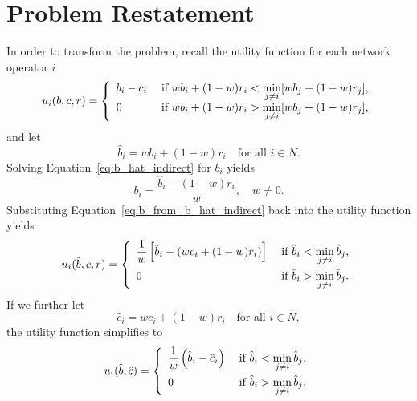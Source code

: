 \section{Problem Restatement} %
\label{sec:problem_restatement_indirect}
In order to transform the problem, recall the utility function for each network operator $i$
\begin{equation*}
  u_i(b,c,r) = \left\{
  \begin{array}{l l}
    b_i-c_i & \;\textrm{if } wb_i + (1-w)r_i < \displaystyle\min_{j\neq i}[wb_j + (1-w)r_j],\\
    0 & \;\textrm{if } wb_i + (1-w)r_i > \displaystyle\min_{j\neq i}[wb_j + (1-w)r_j],
  \end{array}\right.
\end{equation*}
and let
\begin{equation}
  \label{eq:b_hat_indirect}
  \hat{b}_i = wb_i + (1-w)r_i \quad\textrm{for all } i\in N.
\end{equation}
Solving Equation~\eqref{eq:b_hat_indirect} for $b_i$ yields
\begin{equation}
  \label{eq:b_from_b_hat_indirect}
  b_i = \frac{\hat{b}_i - (1-w)r_i}{w}, \quad w\neq 0.
\end{equation}
Substituting Equation~\eqref{eq:b_from_b_hat_indirect} back into the utility function yields
\begin{equation*}
  u_i(\hat{b},c,r) = \left\{
  \begin{array}{l l}
    \displaystyle\frac{1}{w}\left[\hat{b}_i-(wc_i + (1-w)r_i)\right] & \;\textrm{if } \hat{b}_i < \displaystyle\min_{j\neq i}\hat{b}_j,\\[2ex]
    0 & \;\textrm{if } \hat{b}_i > \displaystyle\min_{j\neq i}\hat{b}_j.
  \end{array}\right.
\end{equation*}
If we further let
\begin{equation}
  \label{eq:cost_hat_indirect}
  \hat{c}_i = wc_i + (1-w)r_i \quad\textrm{for all } i\in N,
\end{equation}
the utility function simplifies to
\begin{equation}
  \label{eq:sellers_utility_hat_full_indirect}
  u_i(\hat{b},\hat{c}) = \left\{
  \begin{array}{l l}
    \displaystyle\frac{1}{w}\left(\hat{b}_i-\hat{c}_i\right) & \;\textrm{if } \hat{b}_i < \displaystyle\min_{j\neq i}\hat{b}_j,\\[2ex]
    0 & \;\textrm{if } \hat{b}_i > \displaystyle\min_{j\neq i}\hat{b}_j.
  \end{array}\right.
\end{equation}

